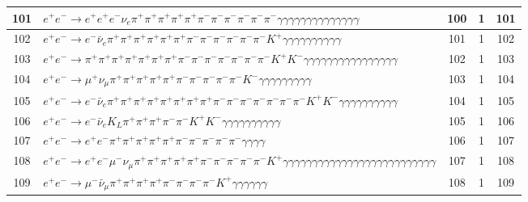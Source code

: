 \documentclass[landscape]{article}
\begin{document}
\begin{table}[htbp!]
\begin{tabular}{|c|>{\centering}p{18cm}|c|c|c|}
\hline
101 & $ e^{+} e^{-} \rightarrow e^{+} e^{+} e^{-} \nu_{e} \pi^{+} \pi^{+} \pi^{+} \pi^{+} \pi^{+} \pi^{-} \pi^{-} \pi^{-} \pi^{-} \pi^{-} \pi^{-} \gamma \gamma \gamma \gamma \gamma \gamma \gamma \gamma \gamma \gamma \gamma \gamma \gamma \gamma $ & 100 & 1 & 101 \\
\hline
102 & $ e^{+} e^{-} \rightarrow e^{-} \bar{\nu}_{e} \pi^{+} \pi^{+} \pi^{+} \pi^{+} \pi^{+} \pi^{+} \pi^{-} \pi^{-} \pi^{-} \pi^{-} \pi^{-} \pi^{-} K^{+} \gamma \gamma \gamma \gamma \gamma \gamma \gamma \gamma \gamma \gamma $ & 101 & 1 & 102 \\
\hline
103 & $ e^{+} e^{-} \rightarrow \pi^{+} \pi^{+} \pi^{+} \pi^{+} \pi^{+} \pi^{+} \pi^{+} \pi^{-} \pi^{-} \pi^{-} \pi^{-} \pi^{-} \pi^{-} \pi^{-} K^{+} K^{-} \gamma \gamma \gamma \gamma \gamma \gamma \gamma \gamma \gamma \gamma \gamma \gamma \gamma \gamma \gamma \gamma $ & 102 & 1 & 103 \\
\hline
104 & $ e^{+} e^{-} \rightarrow \mu^{+} \nu_{\mu} \pi^{+} \pi^{+} \pi^{+} \pi^{+} \pi^{+} \pi^{-} \pi^{-} \pi^{-} \pi^{-} \pi^{-} K^{-} \gamma \gamma \gamma \gamma \gamma \gamma \gamma \gamma \gamma $ & 103 & 1 & 104 \\
\hline
105 & $ e^{+} e^{-} \rightarrow e^{-} \bar{\nu}_{e} \pi^{+} \pi^{+} \pi^{+} \pi^{+} \pi^{+} \pi^{+} \pi^{+} \pi^{+} \pi^{-} \pi^{-} \pi^{-} \pi^{-} \pi^{-} \pi^{-} \pi^{-} K^{+} K^{-} \gamma \gamma \gamma \gamma \gamma \gamma \gamma \gamma \gamma \gamma $ & 104 & 1 & 105 \\
\hline
106 & $ e^{+} e^{-} \rightarrow e^{-} \bar{\nu}_{e} K_{L} \pi^{+} \pi^{+} \pi^{+} \pi^{-} \pi^{-} K^{+} K^{-} \gamma \gamma \gamma \gamma \gamma \gamma \gamma \gamma \gamma \gamma $ & 105 & 1 & 106 \\
\hline
107 & $ e^{+} e^{-} \rightarrow e^{+} e^{-} \pi^{+} \pi^{+} \pi^{+} \pi^{+} \pi^{+} \pi^{-} \pi^{-} \pi^{-} \pi^{-} \pi^{-} \gamma \gamma \gamma \gamma $ & 106 & 1 & 107 \\
\hline
108 & $ e^{+} e^{-} \rightarrow e^{+} e^{-} \mu^{-} \nu_{\mu} \pi^{+} \pi^{+} \pi^{+} \pi^{+} \pi^{+} \pi^{-} \pi^{-} \pi^{-} \pi^{-} \pi^{-} K^{+} \gamma \gamma \gamma \gamma \gamma \gamma \gamma \gamma \gamma \gamma \gamma \gamma \gamma \gamma \gamma \gamma \gamma \gamma \gamma \gamma \gamma \gamma \gamma \gamma \gamma \gamma $ & 107 & 1 & 108 \\
\hline
109 & $ e^{+} e^{-} \rightarrow \mu^{-} \bar{\nu}_{\mu} \pi^{+} \pi^{+} \pi^{+} \pi^{+} \pi^{-} \pi^{-} \pi^{-} \pi^{-} K^{+} \gamma \gamma \gamma \gamma \gamma \gamma $ & 108 & 1 & 109 \\

\end{tabular}
\end{table}
\end{document}
